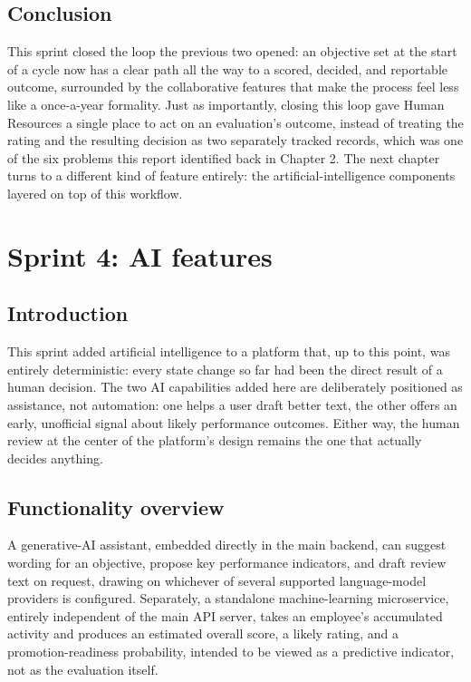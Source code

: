 \documentclass[12pt,a4paper]{report}
\begin{document}
\section{Conclusion}

This sprint closed the loop the previous two opened: an objective set at the start of a cycle now has a clear path all the way to a scored, decided, and reportable outcome, surrounded by the collaborative features that make the process feel less like a once-a-year formality. Just as importantly, closing this loop gave Human Resources a single place to act on an evaluation's outcome, instead of treating the rating and the resulting decision as two separately tracked records, which was one of the six problems this report identified back in Chapter 2. The next chapter turns to a different kind of feature entirely: the artificial-intelligence components layered on top of this workflow.

\chapter{Sprint 4: AI features}
\label{ch:sprint4}

\section{Introduction}

This sprint added artificial intelligence to a platform that, up to this point, was entirely deterministic: every state change so far had been the direct result of a human decision. The two AI capabilities added here are deliberately positioned as assistance, not automation: one helps a user draft better text, the other offers an early, unofficial signal about likely performance outcomes. Either way, the human review at the center of the platform's design remains the one that actually decides anything.

\section{Functionality overview}

A generative-AI assistant, embedded directly in the main backend, can suggest wording for an objective, propose key performance indicators, and draft review text on request, drawing on whichever of several supported language-model providers is configured. Separately, a standalone machine-learning microservice, entirely independent of the main API server, takes an employee's accumulated activity and produces an estimated overall score, a likely rating, and a promotion-readiness probability, intended to be viewed as a predictive indicator, not as the evaluation itself.
\end{document}
